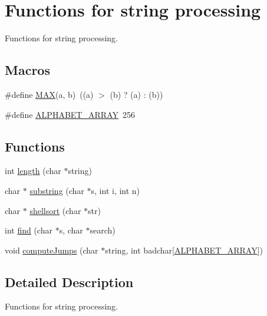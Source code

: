 \hypertarget{group__string__functions}{}\section{Functions for string processing}
\label{group__string__functions}


Functions for string processing.  


\subsection*{Macros}
\begin{DoxyCompactItemize}
\item 
\#define \hyperlink{group__string__functions_gafa99ec4acc4ecb2dc3c2d05da15d0e3f}{M\+AX}(a,  b)~((a)   $>$ (b) ? (a) \+: (b))
\item 
\#define \hyperlink{group__string__functions_ga365663a53db95d4a05469a135a8cb3f3}{A\+L\+P\+H\+A\+B\+E\+T\+\_\+\+A\+R\+R\+AY}~256
\end{DoxyCompactItemize}
\subsection*{Functions}
\begin{DoxyCompactItemize}
\item 
int \hyperlink{group__string__functions_ga84261984e4b1bc441dcbf4dfef6f46fd}{length} (char $\ast$string)
\item 
char $\ast$ \hyperlink{group__string__functions_gab1e0741be6d2932577a358795bfaff5b}{substring} (char $\ast$s, int i, int n)
\item 
char $\ast$ \hyperlink{group__string__functions_ga1244cd9a8538e43d4a96e3d8c7f1e896}{shellsort} (char $\ast$str)
\item 
int \hyperlink{group__string__functions_ga97d8398ed0576999669759e6aaf326f2}{find} (char $\ast$s, char $\ast$search)
\item 
void \hyperlink{group__string__functions_ga63253522e27ba6f973bd3e8d049af997}{compute\+Jumps} (char $\ast$string, int badchar\mbox{[}\hyperlink{group__string__functions_ga365663a53db95d4a05469a135a8cb3f3}{A\+L\+P\+H\+A\+B\+E\+T\+\_\+\+A\+R\+R\+AY}\mbox{]})
\end{DoxyCompactItemize}


\subsection{Detailed Description}
Functions for string processing. 

